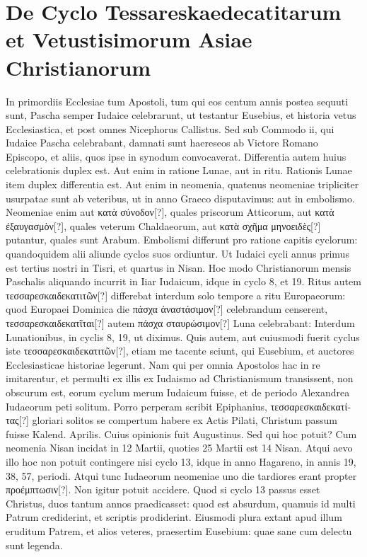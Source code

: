 \section{De Cyclo Tessareskaedecatitarum et Vetustisimorum Asiae Christianorum}
%
In primordiis Ecclesiae tum Apostoli, tum qui eos centum annis
postea sequuti sunt, Pascha semper Iudaice celebrarunt, ut testantur
Eusebius, et historia vetus Ecclesiastica, et post omnes Nicephorus
Callistus.
Sed sub Commodo ii, qui Iudaice Pascha celebrabant,
damnati sunt haereseos ab %
 Victore Romano Episcopo, et aliis,
quos ipse in synodum convocaverat.
Differentia autem huius celebrationis
duplex est.
Aut enim in ratione Lunae, aut in ritu.
Rationis Lunae item duplex differentia est.
Aut enim in neomenia,
quatenus neomeniae tripliciter usurpatae sunt ab %
 veteribus, ut in anno
Graeco disputavimus: aut in embolismo.
Neomeniae enim aut
\textgreek{κατὰ σύνοδον[?]}, quales priscorum Atticorum,
 aut \textgreek{κατὰ ἐξαυγασμὸν[?]}, quales
veterum Chaldaeorum, aut \textgreek{κατὰ σχῆμα μηνοειδὲς[?]} putantur,
 quales sunt
Arabum.
Embolismi differunt pro ratione capitis cyclorum: quandoquidem
alii aliunde cyclos suos ordiuntur.
Ut Iudaici cycli annus primus
est tertius nostri in Tisri, et quartus in Nisan.
Hoc modo Christianorum
mensis Paschalis aliquando incurrit in Iiar Iudaicum, idque
in cyclo 8, et 19.
Ritus autem \textgreek{τεσσαρεσκαιδεκατιτῶν[?]} differebat interdum
solo tempore a ritu Europaeorum: quod Europaei Dominica
die \textgreek{πάσχα ἀναστάσιμον[?]} celebrandum censerent,
 \textgreek{τεσσαρεσκαιδεκατῖται[?]}
autem \textgreek{πάσχα σταυρώσιμον[?]}  Luna celebrabant: Interdum
Lunationibus, in cyclis 8, 19, ut diximus.
Quis autem, aut
cuiusmodi fuerit cyclus iste \textgreek{τεσσαρεσκαιδεκατιτῶν[?]},
 etiam me tacente
sciunt, qui Eusebium, et auctores Ecclesiasticae historiae legerunt.
Nam qui per omnia Apostolos hac in re imitarentur, et permulti
ex illis ex Iudaismo ad Christianismum transissent, non obscurum
est, eorum cyclum merum Iudaicum fuisse, et de periodo Alexandrea
Iudaeorum peti solitum.
%
Porro perperam scribit Epiphanius,
\textgreek{τεσσαρεσκαιδεκατίτας[?]} gloriari solitos se compertum habere ex
Actis Pilati, Christum passum fuisse  Kalend. %
 Aprilis.
Cuius opinionis
fuit Augustinus.
Sed qui hoc potuit?
Cum neomenia Nisan
incidat in 12 Martii, quoties 25 Martii est 14 Nisan.
Atqui aevo illo
hoc non potuit contingere nisi cyclo 13, idque in anno Hagareno,
in annis 19, 38, 57, periodi.
Atqui tunc Iudaeorum neomeniae uno
die tardiores erant propter \textgreek{προέμπτωσιν[?]}.
Non igitur potuit accidere.
Quod si cyclo 13 passus esset Christus, duos tantum annos praedicasset:
quod est absurdum, quamuis id multi Patrum crediderint, et
scriptis prodiderint.
Eiusmodi plura extant apud illum eruditum Patrem,
et alios veteres, praesertim Eusebium: quae sane cum delectu
sunt legenda.
%
